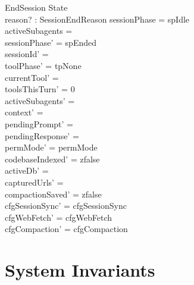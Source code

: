 \documentclass[a4paper,10pt,fleqn]{article}
\begin{document}
\begin{schema}{EndSession}
  \Delta State \\
  reason? : SessionEndReason
  \where
  sessionPhase = spIdle \\
  activeSubagents = \emptyset \\
  sessionPhase' = spEnded \\
  sessionId' = \emptyset \\
  toolPhase' = tpNone \\
  currentTool' = \emptyset \\
  toolsThisTurn' = 0 \\
  activeSubagents' = \emptyset \\
  context' = \langle \rangle \\
  pendingPrompt' = \emptyset \\
  pendingResponse' = \emptyset \\
  permMode' = permMode \\
  codebaseIndexed' = zfalse \\
  activeDb' = \emptyset \\
  capturedUrls' = \emptyset \\
  compactionSaved' = zfalse \\
  cfgSessionSync' = cfgSessionSync \\
  cfgWebFetch' = cfgWebFetch \\
  cfgCompaction' = cfgCompaction
\end{schema}

\section{System Invariants}
\end{document}
